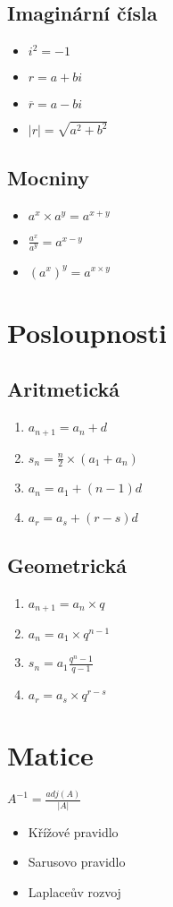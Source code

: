 \documentclass{article}
\begin{document}
\begin{multicols}{2}
\subsection{Imaginární čísla}
\begin{itemize}
    \item $i^{2}=-1$
    \item $r=a+bi$
    \item $\overline{r}=a-bi$
    \item $\left|r\right|=\sqrt{a^{2}+b^{2}}$
\end{itemize}
\subsection{Mocniny}
\begin{itemize}
    \item $a^{x}\times a^{y}=a^{x+y}$
    \item $\frac{a^{x}}{a^{y}}=a^{x-y}$
    \item $\left(a^{x}\right)^{y}=a^{x\times y}$
\end{itemize}
\section{Posloupnosti}
\subsection{Aritmetická}
\begin{enumerate}
    \item $a_{n+1}=a_{n}+d$
    \item $s_{n}=\frac{n}{2}\times\left(a_{1}+a_{n}\right)$
    \item $a_{n}=a_{1}+\left(n-1\right)d$
    \item $a_{r}=a_{s}+\left(r-s\right)d$
\end{enumerate}
\subsection{Geometrická}
\begin{enumerate}
    \item $a_{n+1}=a_{n}\times q$
    \item $a_{n}=a_{1}\times q^{n-1}$
    \item $s_{n}=a_{1}\frac{q^{n}-1}{q-1}$
    \item $a_{r}=a_{s}\times q^{r-s}$
\end{enumerate}
\section{Matice}
$A^{-1}=\frac{adj\left(A\right)}{\left|A\right|}$
\begin{itemize}
    \item Křížové pravidlo
    \item Sarusovo pravidlo
    \item Laplaceův rozvoj
\end{itemize}

\end{multicols}
\end{document}
